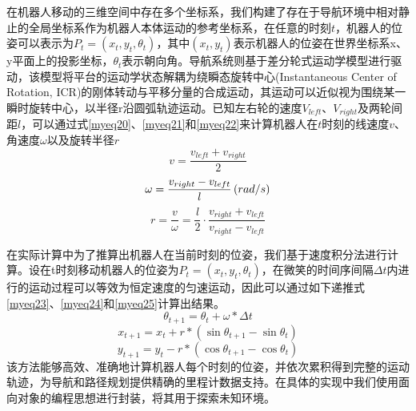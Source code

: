 在机器人移动的三维空间中存在多个坐标系，我们构建了存在于导航环境中相对静止的全局坐标系作为机器人本体运动的参考坐标系，在任意的时刻$t$，机器人的位姿可以表示为${P_t} = \left( {{x_t},{y_t},{\theta _t}} \right)$，其中$\left( {{x_t},{y_t}} \right)$表示机器人的位姿在世界坐标系x、y平面上的投影坐标，${{\theta _t}}$表示朝向角。导航系统则基于差分轮式运动学模型进行驱动，该模型将平台的运动学状态解耦为绕瞬态旋转中心(Instantaneous Center of Rotation, ICR)的刚体转动与平移分量的合成运动，其运动可以近似视为围绕某一瞬时旋转中心，以半径r沿圆弧轨迹运动。已知左右轮的速度${V_{left}}$、${V_{right}}$及两轮间距$l$，可以通过式\eqref{myeq20}、\eqref{myeq21}和\eqref{myeq22}来计算机器人在$t$时刻的线速度$v$、角速度$\omega $以及旋转半径$r$
\begin{equation}
    v = \frac{{{v_{left}} + {v_{right}}}}{2}
    \label{myeq20}
\end{equation}
\begin{equation}
    \omega  = \frac{{{v_{right}} - {v_{left}}}}{l}\left( {{{rad} \mathord{\left/
 {\vphantom {{rad} s}} \right.
 \kern-\nulldelimiterspace} s}} \right)
    \label{myeq21}
\end{equation}
\begin{equation}
    r = \frac{v}{\omega } = \frac{l}{2} \cdot \frac{{{v_{right}} + {v_{left}}}}{{{v_{right}} - {v_{left}}}}
    \label{myeq22}
\end{equation}


在实际计算中为了推算出机器人在当前时刻的位姿，我们基于速度积分法进行计算。设在t时刻移动机器人的位姿为${P_t} = \left( {{x_{t}},{y_{t}},{\theta _{t}}} \right)$，在微笑的时间序间隔$\Delta t$内进行的运动过程可以等效为恒定速度的匀速运动，因此可以通过如下递推式\eqref{myeq23}、\eqref{myeq24}和\eqref{myeq25}计算出结果。
\begin{equation}
{\theta _{t + 1}} = {\theta _{t}} + \omega  * \Delta t
    \label{myeq23}
\end{equation}
\begin{equation}
    {x_{t + 1}} = {x_{t}} + r * \left( {\sin {\theta _{t + 1}} - \sin {\theta _{t}}} \right)
    \label{myeq24}
\end{equation}
\begin{equation}
{y_{t + 1}} = {y_{t}} - r * \left( {\cos {\theta _{t + 1}} - \cos {\theta _{t}}} \right)
    \label{myeq25}
\end{equation}
该方法能够高效、准确地计算机器人每个时刻的位姿，并依次累积得到完整的运动轨迹，为导航和路径规划提供精确的里程计数据支持。在具体的实现中我们使用面向对象的编程思想进行封装，将其用于探索未知环境。

